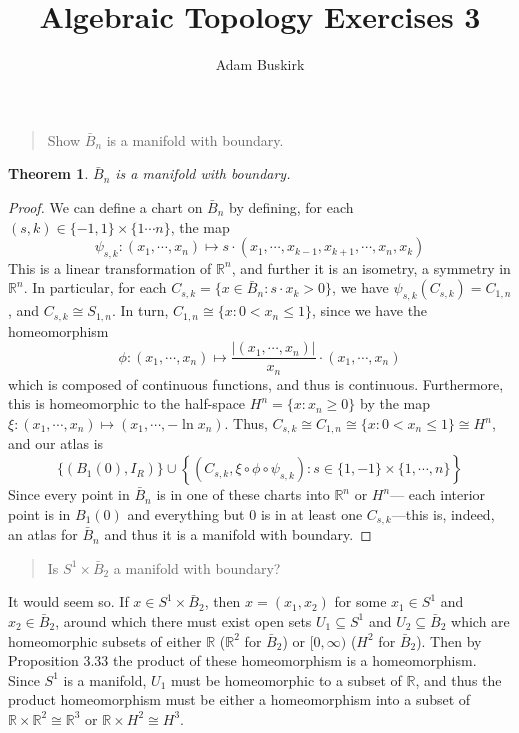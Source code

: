 \documentclass{article}
\title{Algebraic Topology Exercises 3}
\author{Adam Buskirk}
\newtheorem{theorem}[subsection]{Theorem}
\theoremstyle{definition}
\newcommand{\R}{\mathbb{R}}
\newcommand{\set}[1]{\left\{#1\right\}}
\begin{document}
\maketitle

\begin{quote}
Show $\bar{B}_n$ is a manifold with boundary.
\end{quote}
\begin{theorem}
$\bar{B}_n$ is a manifold with boundary.
\end{theorem}
\begin{proof}
We can define a chart on $\bar{B}_n$ by defining, for each 
$(s,k) \in \{ -1, 1 \} \times \{ 1 \cdots n \}$, the map 
\[ 
\psi_{s,k} : (x_1 , \cdots , x_n) 
\mapsto s \cdot (x_1, \cdots, x_{k-1}, x_{k+1}, \cdots, x_n, x_k) 
\] 
This
is a linear transformation of $\R^n$, and further it is an isometry,
a symmetry in $\R^n$.
In particular, for each 
$C_{s,k} = \{ x \in \bar{B}_n : s \cdot x_k > 0\}$, we have
$\psi_{s,k} (C_{s,k}) = C_{1,n}$, and $C_{s,k} \cong S_{1,n}$. 
In turn, $C_{1,n} \cong \{ x : 0 < x_n \le 1\}$, since we have the 
homeomorphism 
\[
\phi : (x_1, \cdots, x_n) 
\mapsto 
\frac{ |(x_1,\cdots,x_n)|}{x_n} \cdot (x_1, \cdots, x_n)
\]
which is composed of continuous functions, and thus is continuous. Furthermore,
this is homeomorphic to the half-space $H^n=\{ x : x_n \ge 0 \}$ by the map 
$\xi : (x_1,\cdots,x_n) \mapsto (x_1, \cdots, -\ln x_n)$. 
Thus, $C_{s,k} \cong C_{1,n} \cong \{ x : 0 < x_n \le 1 \} \cong H^n$, and our
atlas is
\[ 
\{(B_1(0), I_R)\} 
\cup \set{ (C_{s,k},\xi \circ \phi \circ \psi_{s,k}) 
: s \in \{1,-1\}\times\{1,\cdots,n\} } 
\]
Since every point in $\bar{B}_n$ is in one of these charts into $\R^n$ or $H^n$---%
each interior point is
in $B_1(0)$ and everything but $0$ is in at least one $C_{s,k}$---this is, indeed,
an atlas for $\bar{B}_n$ and thus it is a manifold with boundary.
\end{proof}

\begin{quote}
Is $S^1 \times \bar{B}_2$ a manifold with boundary?
\end{quote}
It would seem so. If $x \in S^1 \times \bar{B}_2$, then $x=(x_1, x_2)$
for some $x_1 \in S^1$ and $x_2 \in \bar{B}_2$, around which there must exist 
open sets $U_1\subseteq S^1$ and $U_2\subseteq\bar{B}_2$ which are homeomorphic 
subsets of either $\R$ ($\R^2$ for $\bar{B}_2$) 
or $[0,\infty)$ ($H^2$ for $\bar{B}_2$). Then by Proposition 3.33 the product of these 
homeomorphism is a homeomorphism. Since $S^1$ is a manifold, $U_1$ must be 
homeomorphic to a subset of $\R$, and thus the product homeomorphism must be 
either a homeomorphism into a subset of $\R \times \R^2 \cong \R^3$ or 
$\R \times H^2 \cong H^3$.
\end{document}
